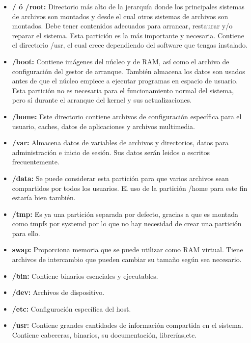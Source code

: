 	\begin{itemize}
		\item \textbf{/ ó /root:} Directorio más alto de la jerarquía donde los principales sistemas de archivos son montados y desde el cual otros sistemas de archivos son montados. Debe tener contenidos adecuados para arrancar, restaurar y/o reparar el sistema. Esta partición es la más importante y necesaria. Contiene el directorio /usr, el cual crece dependiendo del software que tengas instalado.
		\item \textbf{/boot:} Contiene imágenes del núcleo y de RAM, así como el archivo de configuración del gestor de arranque. También almacena los datos son usados antes de que el núcleo empiece a ejecutar programas en espacio de usuario. 
		Esta partición no es necesaria para el funcionamiento normal del sistema, pero sí durante el arranque del kernel y sus actualizaciones.
		\item \textbf{/home:} Este directorio contiene archivos de configuración específica para el usuario, caches, datos de aplicaciones y archivos multimedia.
		\item \textbf{/var:} Almacena datos de variables de archivos y directorios, datos para administración e inicio de sesión. Sus datos serán leidos o escritos frecuentemente.
		\item \textbf{/data:} Se puede considerar esta partición para que varios archivos sean compartidos por todos los usuarios. El uso de la partición /home para este fin estaría bien también.
		\item \textbf{/tmp:} Es ya una partición separada por defecto, gracias a que es montada como tmpfs por systemd por lo que no hay necesidad de crear una partición para ello.
		\item \textbf{swap:} Proporciona memoria que se puede utilizar como RAM virtual. Tiene archivos de intercambio que pueden cambiar su tamaño según sea necesario.
		\item \textbf{/bin\cite{treinta}:} Contiene binarios esenciales y ejecutables.
		\item \textbf{/dev\cite{treintayuno}:} Archivos de dispositivo.
		\item \textbf{/etc\cite{treintaydos}:} Configuración específica del host.
		\item \textbf{/usr\cite{treintaytres}:} Contiene grandes cantidades de información compartida en el sistema. Contiene cabeceras, binarios, su documentación, librerías,etc. 
	\end{itemize}
	
